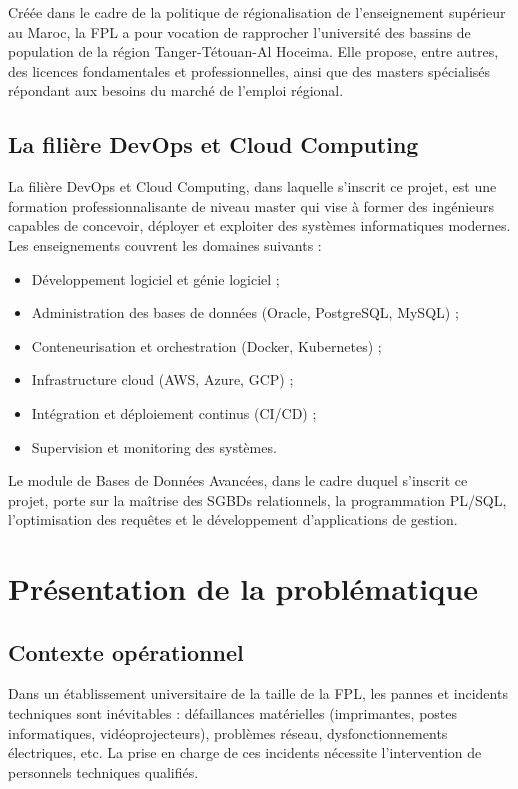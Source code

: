 \documentclass[12pt,a4paper,oneside]{report}
\begin{document}
Créée dans le cadre de la politique de régionalisation de l'enseignement supérieur au Maroc, la FPL a pour vocation de rapprocher l'université des bassins de population de la région Tanger-Tétouan-Al Hoceima. Elle propose, entre autres, des licences fondamentales et professionnelles, ainsi que des masters spécialisés répondant aux besoins du marché de l'emploi régional.

\subsection{La filière DevOps et Cloud Computing}

La filière DevOps et Cloud Computing, dans laquelle s'inscrit ce projet, est une formation professionnalisante de niveau master qui vise à former des ingénieurs capables de concevoir, déployer et exploiter des systèmes informatiques modernes. Les enseignements couvrent les domaines suivants :

\begin{itemize}[leftmargin=2em]
  \item Développement logiciel et génie logiciel ;
  \item Administration des bases de données (Oracle, PostgreSQL, MySQL) ;
  \item Conteneurisation et orchestration (Docker, Kubernetes) ;
  \item Infrastructure cloud (AWS, Azure, GCP) ;
  \item Intégration et déploiement continus (CI/CD) ;
  \item Supervision et monitoring des systèmes.
\end{itemize}

Le module de Bases de Données Avancées, dans le cadre duquel s'inscrit ce projet, porte sur la maîtrise des SGBDs relationnels, la programmation PL/SQL, l'optimisation des requêtes et le développement d'applications de gestion.

\section{Présentation de la problématique}

\subsection{Contexte opérationnel}

Dans un établissement universitaire de la taille de la FPL, les pannes et incidents techniques sont inévitables : défaillances matérielles (imprimantes, postes informatiques, vidéoprojecteurs), problèmes réseau, dysfonctionnements électriques, etc. La prise en charge de ces incidents nécessite l'intervention de personnels techniques qualifiés.
\end{document}
